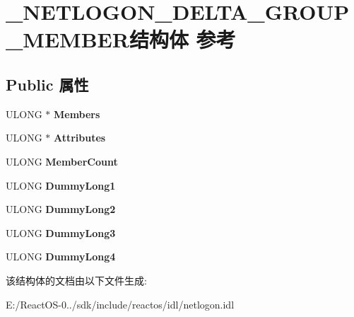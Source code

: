 \hypertarget{struct___n_e_t_l_o_g_o_n___d_e_l_t_a___g_r_o_u_p___m_e_m_b_e_r}{}\section{\+\_\+\+N\+E\+T\+L\+O\+G\+O\+N\+\_\+\+D\+E\+L\+T\+A\+\_\+\+G\+R\+O\+U\+P\+\_\+\+M\+E\+M\+B\+E\+R结构体 参考}
\label{struct___n_e_t_l_o_g_o_n___d_e_l_t_a___g_r_o_u_p___m_e_m_b_e_r}
\subsection*{Public 属性}
\begin{DoxyCompactItemize}
\item 
\mbox{\label{struct___n_e_t_l_o_g_o_n___d_e_l_t_a___g_r_o_u_p___m_e_m_b_e_r_ab3b5a05e8379871a8064301efe2c5d0f}} 
U\+L\+O\+NG $\ast$ {\bfseries Members}
\item 
\mbox{\label{struct___n_e_t_l_o_g_o_n___d_e_l_t_a___g_r_o_u_p___m_e_m_b_e_r_a2b44cf806fe4bff95c414a7418592efb}} 
U\+L\+O\+NG $\ast$ {\bfseries Attributes}
\item 
\mbox{\label{struct___n_e_t_l_o_g_o_n___d_e_l_t_a___g_r_o_u_p___m_e_m_b_e_r_a0c81b9d3ab580d5ba7af497d93b83e0d}} 
U\+L\+O\+NG {\bfseries Member\+Count}
\item 
\mbox{\label{struct___n_e_t_l_o_g_o_n___d_e_l_t_a___g_r_o_u_p___m_e_m_b_e_r_a59cd8d83d4ded99e12f14d49c9a7fc1d}} 
U\+L\+O\+NG {\bfseries Dummy\+Long1}
\item 
\mbox{\label{struct___n_e_t_l_o_g_o_n___d_e_l_t_a___g_r_o_u_p___m_e_m_b_e_r_a3c6b1355e7e601be809358045e1fdacd}} 
U\+L\+O\+NG {\bfseries Dummy\+Long2}
\item 
\mbox{\label{struct___n_e_t_l_o_g_o_n___d_e_l_t_a___g_r_o_u_p___m_e_m_b_e_r_a6388a5e6ab565507f9cd85309f3a7fe5}} 
U\+L\+O\+NG {\bfseries Dummy\+Long3}
\item 
\mbox{\label{struct___n_e_t_l_o_g_o_n___d_e_l_t_a___g_r_o_u_p___m_e_m_b_e_r_a687dbafc6223e7850a869cb697ec5f94}} 
U\+L\+O\+NG {\bfseries Dummy\+Long4}
\end{DoxyCompactItemize}


该结构体的文档由以下文件生成\+:\begin{DoxyCompactItemize}
\item 
E\+:/\+React\+O\+S-\/0../sdk/include/reactos/idl/netlogon.\+idl\end{DoxyCompactItemize}
